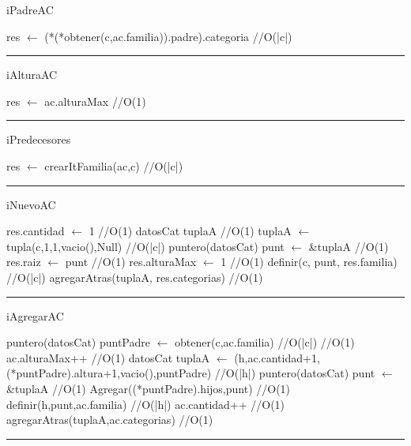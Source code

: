 \begin{algorithm}[H]
\caption{iPadreAC}
\begin{algorithmic}[1]
\state res $\gets$ (*(*obtener(c,ac.familia)).padre).categoria \hfill //O(|c|)
\EndFunction 
\end{algorithmic}
\hrule
{}
\end{algorithm}

\begin{algorithm}[H]
\caption{iAlturaAC}
\begin{algorithmic}[1]
\state res $\gets$ ac.alturaMax \hfill //O(1)
\EndFunction 
\end{algorithmic}
\hrule
{}
\end{algorithm}

\begin{algorithm}[H]
\caption{iPredecesores}
\begin{algorithmic}[1]
\state res $\gets$ crearItFamilia(ac,c) \hfill //O(|c|)
\EndFunction 
\end{algorithmic}
\hrule
{}
\end{algorithm}

\begin{algorithm}[H]
\caption{iNuevoAC}
\begin{algorithmic}[1]
\state res.cantidad $\gets$ 1 \hfill //O(1)
\state datosCat tuplaA \hfill //O(1)
\state tuplaA $\gets$ tupla(c,1,1,vacio(),Null) \hfill //O(|c|)
\state puntero(datosCat) punt $\gets$ \&tuplaA \hfill //O(1)
\state res.raiz $\gets$ punt \hfill //O(1)
\state res.alturaMax $\gets$ 1 \hfill //O(1)
\state definir(c, punt, res.familia) \hfill //O(|c|)
\state agregarAtras(tuplaA, res.categorias) \hfill //O(1)
\EndFunction 
\end{algorithmic}
\hrule
{}
\end{algorithm}

\begin{algorithm}[H]
\caption{iAgregarAC}
\begin{algorithmic}[1]
\state puntero(datosCat) puntPadre $\gets$ obtener(c,ac.familia) \hfill //O(|c|)
 \hfill //O(1)
\state ac.alturaMax++ \hfill //O(1)
\endif
\state datosCat tuplaA $\gets$ (h,ac.cantidad+1,(*puntPadre).altura+1,vacio(),puntPadre) \hfill //O(|h|)
\state puntero(datosCat) punt $\gets$ \&tuplaA \hfill //O(1)
\state Agregar((*puntPadre).hijos,punt) \hfill //O(1)
\state definir(h,punt,ac.familia) \hfill //O(|h|)
\state ac.cantidad++ \hfill //O(1)
\state agregarAtras(tuplaA,ac.categorias) \hfill //O(1)
\EndFunction 
\end{algorithmic}
\hrule
{}
\end{algorithm}

